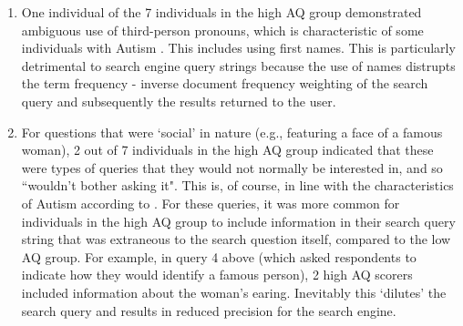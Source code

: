\documentclass[a4paper, 11pt]{article}
\begin{document}
\begin{enumerate}
{
}

\item{One individual of the 7 individuals in the high AQ group demonstrated ambiguous use of third-person pronouns, which is characteristic of some individuals with Autism \cite{pronoun}. This includes using first names. This is particularly detrimental to search engine query strings because the use of names distrupts the term frequency - inverse document frequency weighting \cite{tfidf} of the search query and subsequently the results returned to the user.
}\label{pronoun}
 
\item{
For questions that were `social' in nature (e.g., featuring a face of a famous woman), 2 out of 7 individuals in the high AQ group indicated that these were types of queries that they would not normally be interested in, and so ``wouldn't bother asking it". This is, of course, in line with the characteristics of Autism according to \cite{DSM}. For these queries, it was more common for individuals in the high AQ group to include information in their search query string that was extraneous to the search question itself, compared to the low AQ group. For example, in query 4 above (which asked respondents to indicate how they would identify a famous person), 2 high AQ scorers included information about the woman's earing. Inevitably this `dilutes' the search query and results in reduced precision for the search engine.
}

\end{enumerate}
\end{document}
